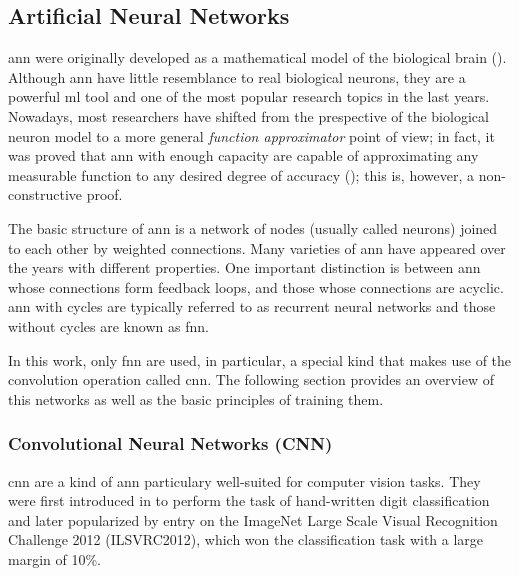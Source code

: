 \documentclass[../main.tex]{subfiles}
\begin{document}
\subsection{Artificial Neural Networks}
\label{sec:artificial-neural-networks}

\gls{ann} were originally developed as a mathematical model of the biological brain
(\cite{McCulloch1943,Rosenblatt58theperceptron,Rumelhart1987}).
Although \gls{ann} have little resemblance to real biological neurons, they are
a powerful \gls{ml} tool and one of the most popular research topics in the last years.
Nowadays, most researchers have shifted from the prespective of the biological
neuron model to a more general \emph{function approximator} point of view;
in fact, it was proved that \gls{ann} with enough capacity are capable of
approximating any measurable function to any desired degree of accuracy
(\cite{Cybenko1989,Hornik1991251}); this is, however, a non-constructive proof.

The basic structure of \gls{ann} is a network of nodes (usually called neurons)
joined to each other by weighted connections.
Many varieties of \gls{ann} have appeared over the years with different properties.
One important distinction is between \gls{ann} whose connections form
feedback loops, and those whose connections are acyclic.
\gls{ann} with cycles are typically referred to as recurrent neural networks
and those without cycles are known as \gls{fnn}.

In this work, only \gls{fnn} are used, in particular, a special kind that makes
use of the convolution operation called \gls{cnn}.
The following section provides an overview of this networks as well as the
basic principles of training them.

\subsubsection{Convolutional Neural Networks (CNN)}
\gls{cnn} are a kind of \gls{ann} particulary well-suited for computer vision
tasks. They were first introduced in \cite{LeCun1998} to perform the task of
hand-written digit classification and later popularized by \cite{Krizhevsky2012}
entry on the ImageNet Large Scale Visual Recognition Challenge 2012
(ILSVRC2012)\footnotemark, which won the classification task with a large
margin of 10\%.
\end{document}

